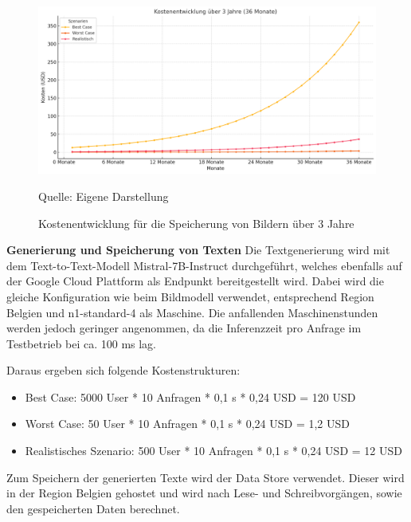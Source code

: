 \begin{figure}[htbp]
    \includegraphics[width=\textwidth, height=\textheight, keepaspectratio]{abbildungen/KostenSpeicher}
    \caption{Kostenentwicklung für die Speicherung von Bildern über 3 Jahre}
    \label{fig:KostenentwicklungSpeicher}
    \vspace{0.5cm}
    \raggedright Quelle: Eigene Darstellung
\end{figure}

\textbf{Generierung und Speicherung von Texten}\newline
Die Textgenerierung wird mit dem Text-to-Text-Modell Mistral-7B-Instruct durchgeführt, welches ebenfalls auf der Google Cloud Plattform als Endpunkt bereitgestellt wird.
Dabei wird die gleiche Konfiguration wie beim Bildmodell verwendet, entsprechend Region Belgien und n1-standard-4 als Maschine.
Die anfallenden Maschinenstunden werden jedoch geringer angenommen, da die Inferenzzeit pro Anfrage im Testbetrieb bei ca. 100 ms lag.

Daraus ergeben sich folgende Kostenstrukturen:
\begin{itemize}
    \item Best Case: 5000 User * 10 Anfragen * 0,1 s * 0,24 \ac{USD} = 120 \ac{USD}
    \item Worst Case: 50 User * 10 Anfragen * 0,1 s * 0,24 \ac{USD} = 1,2 \ac{USD}
    \item Realistisches Szenario: 500 User * 10 Anfragen * 0,1 s * 0,24 \ac{USD} = 12 \ac{USD}
\end{itemize}

Zum Speichern der generierten Texte wird der Data Store verwendet.
Dieser wird in der Region Belgien gehostet und wird nach Lese- und Schreibvorgängen, sowie den gespeicherten Daten berechnet.

